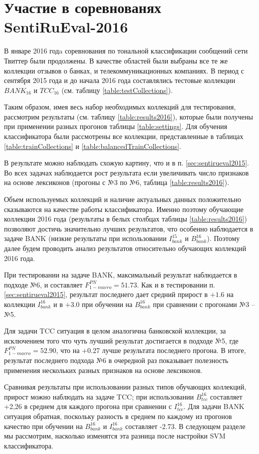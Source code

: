 \section{Участие в соревнованях SentiRuEval-2016}
\label{sec:sentirueval2016}

В январе 2016 годa соревнования по тональной классификации сообщений
сети Твиттер были продолжены.
В качестве областей были выбраны все те же коллекции отзывов о банках,
и телекоммуникационных компаниях. В период с сентября 2015 года и до начала
2016 года составлялись тестовые коллекции $BANK_{16}$ и $TCC_{16}$ (см.
таблицу \ref{table:testCollections}).

Таким образом, имея весь набор необходимых коллекций для тестирования, рассмотрим
результаты (см. таблицу \ref{table:results2016}), которые были получены при
применении разных прогонов таблицы \ref{table:settings}.
Для обучения классификатора были рассмотрены все коллекции, представленные в
таблицах \ref{table:trainCollections} и \ref{table:balancedTrainCollections}.



В результате можно наблюдать схожую картину, что и в п. \ref{sec:sentirueval2015}.
Во всех задачах наблюдается рост результата если увеличивать число признаков
на основе лексиконов (прогоны с №3 по №6, таблица \ref{table:results2016}).

Объем используемых коллекций и наличие актуальных данных положительно сказываются
на качестве работы классификатора.
Именно поэтому обучающие коллекции 2016 года
(результаты в белых столбцах таблицы \ref{table:results2016})
позволяют достичь значительно лучших результатов, что особенно
наблюдается в задаче BANK (низкие результаты при использовании $I_{bank}^{15}$
и $B_{bank}^{16}$).
Поэтому далее будем проводить анализ результатов относительно обучающих
коллекций 2016 года.

При тестировании на задаче BANK, максимальный результат наблюдается
в подходе №6, и составляет $F_{1-macro}^{PN} = 51.73$.
Как и в тестировании п. \ref{sec:sentirueval2015}, результат последнего
дает средний прирост в $+1.6$ на коллекции $I_{bank}^{16}$ и в $+3.0$
при обучении на $B_{bank}^{16}$ при сравнении с прогонами №3 -- №5.

Для задачи TCC ситуация в целом аналогична банковской коллекции, за исключением
того что чуть лучший результат достигается в подходе №5, где
$F_{1-macro}^{PN} = 52.90$,
что на +0.27 лучше результата последнего прогона.
В итоге, результат последнего подхода №6 в очередной раз показывает полезность
применения нескольких разных признаков на основе лексиконов.

Сравнивая результаты при использовании разных типов обучающих коллекций,
прирост можно наблюдать на задаче TCC; при использовании $B_{tcc}^{16}$
составляет +2,26 в среднем для каждого прогона при сравнении с $I_{tcc}^{16}$.
Для задачи BANK ситуация обратная, поскольку разность в среднем по каждому
из прогонов качество при обучении на $B_{bank}^{16}$  и $I_{bank}^{16}$
составляет -2.73.
В следующем разделе мы рассмотрим, насколько изменятся эта разница после
настройки SVM классификатора.
